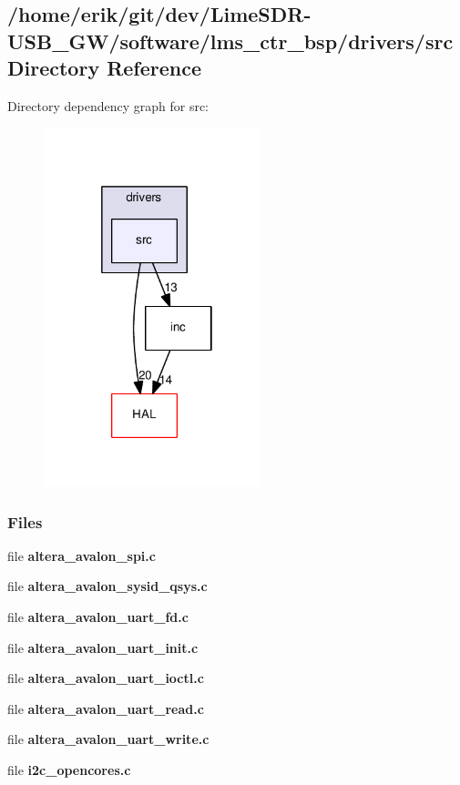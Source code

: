 \subsection{/home/erik/git/dev/\+Lime\+S\+D\+R-\/\+U\+S\+B\+\_\+\+G\+W/software/lms\+\_\+ctr\+\_\+bsp/drivers/src Directory Reference}
\label{dir_b65e41f6aa26d9f3b71ce5ed57219330}
Directory dependency graph for src\+:
\nopagebreak
\begin{figure}[H]
\begin{center}
\leavevmode
\includegraphics[width=178pt]{dir_b65e41f6aa26d9f3b71ce5ed57219330_dep}
\end{center}
\end{figure}
\subsubsection*{Files}
\begin{DoxyCompactItemize}
\item 
file {\bf altera\+\_\+avalon\+\_\+spi.\+c}
\item 
file {\bf altera\+\_\+avalon\+\_\+sysid\+\_\+qsys.\+c}
\item 
file {\bf altera\+\_\+avalon\+\_\+uart\+\_\+fd.\+c}
\item 
file {\bf altera\+\_\+avalon\+\_\+uart\+\_\+init.\+c}
\item 
file {\bf altera\+\_\+avalon\+\_\+uart\+\_\+ioctl.\+c}
\item 
file {\bf altera\+\_\+avalon\+\_\+uart\+\_\+read.\+c}
\item 
file {\bf altera\+\_\+avalon\+\_\+uart\+\_\+write.\+c}
\item 
file {\bf i2c\+\_\+opencores.\+c}
\end{DoxyCompactItemize}

